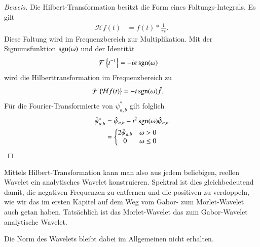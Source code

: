 \begin{refsection}

\begin{proof}[Beweis]
	Die Hilbert-Transformation besitzt die Form eines Faltungs-Integrals.
	Es gilt
	\begin{align*}
		\mathcal{H} f(t) &= f(t) * \frac{1}{\pi t}.
	\end{align*}
	Diese Faltung wird im Frequenzbereich zur Multiplikation.
	Mit der Signumsfunktion $\sgn(\omega)$ und der Identität
	\begin{align*}
		\mathcal{F} \left\lbrace t^{-1}\right\rbrace  &= -i\pi\sgn(\omega)
	\end{align*}
	wird die Hilberttransformation im Frequenzbereich zu
	\begin{align*}
		\mathcal{F}\left\lbrace \mathcal{H}f(t)\right\rbrace 
		&= -i\sgn(\omega) \hat{f}.
	\end{align*}
	Für die Fourier-Transformierte von $\psi^\ast_{a,b}$ gilt folglich 
	\begin{align*}
		\hat{\psi}^\ast_{a,b} 
		&= \hat{\psi}_{a,b} - i^2\sgn(\omega)\hat{\psi}_{a,b}\\
		&=\left\lbrace\begin{matrix}
			2\hat{\psi}_{a,b} & \omega > 0\\
			0 & \omega \le 0
		\end{matrix} \right.
	\end{align*}
\end{proof}

Mittels Hilbert-Transformation kann man also aus jedem beliebigen, reellen Wavelet ein analytisches Wavelet konstruieren.
Spektral ist dies gleichbedeutend damit, die negativen Frequenzen zu entfernen und die positiven zu verdoppeln, wie wir das im ersten Kapitel auf dem Weg vom Gabor- zum Morlet-Wavelet auch getan haben.
Tatsächlich ist das Morlet-Wavelet das zum Gabor-Wavelet analytische Wavelet.

Die Norm des Wavelets bleibt dabei im Allgemeinen nicht erhalten.


\end{refsection}
